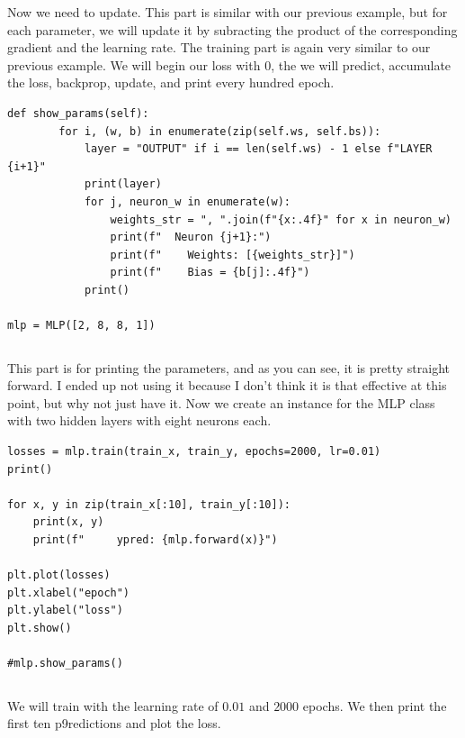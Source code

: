 \documentclass[../../../main.tex]{subfiles}
\begin{document}
Now we need to update. This part is similar with our previous
example, but for each parameter, we will update it by subracting the
product of the corresponding gradient and the learning rate.
The training part is again very similar to our previous example.
We will begin our loss with $0$, the we will predict, accumulate the
loss, backprop, update, and print every hundred epoch.

\begin{jupyter}
\begin{lstlisting}[style=jin]
    def show_params(self):
        for i, (w, b) in enumerate(zip(self.ws, self.bs)):
            layer = "OUTPUT" if i == len(self.ws) - 1 else f"LAYER {i+1}"
            print(layer)
            for j, neuron_w in enumerate(w):
                weights_str = ", ".join(f"{x:.4f}" for x in neuron_w)
                print(f"  Neuron {j+1}:")
                print(f"    Weights: [{weights_str}]")
                print(f"    Bias = {b[j]:.4f}")
            print()

mlp = MLP([2, 8, 8, 1])
\end{lstlisting}
\begin{lstlisting}[style=jout]
\end{lstlisting}
\end{jupyter}

This part is for printing the parameters, and as you can see, it is
pretty straight forward. I ended up not using it because I don't think
it is that effective at this point, but why not just have it.
Now we create an instance for the MLP class with two hidden layers
with eight neurons each.

\begin{jupyter}
\begin{lstlisting}[style=jin]
losses = mlp.train(train_x, train_y, epochs=2000, lr=0.01)
print()

for x, y in zip(train_x[:10], train_y[:10]):
    print(x, y)
    print(f"     ypred: {mlp.forward(x)}")

plt.plot(losses)
plt.xlabel("epoch")
plt.ylabel("loss")
plt.show()

#mlp.show_params()
\end{lstlisting}
\begin{lstlisting}[style=jout]
\end{lstlisting}
\end{jupyter}

We will train with the learning rate of $0.01$ and $2000$ epochs.
We then print the first ten p9redictions and plot the loss.
\end{document}
